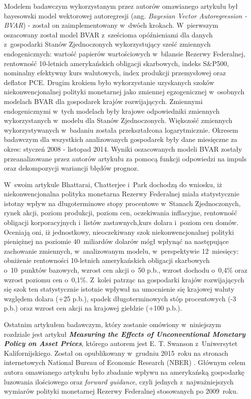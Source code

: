 Modelem badawczym wykorzystanym przez autorów omawianego artykułu był bayesowski model wektorowej autoregresji (ang. \textit{Bayesian Vector Autoregression - BVAR})  - został on zaimplementowany w~dwóch krokach. W~pierwszym oszacowany został model \acs{BVAR} z~sześcioma opóźnieniami dla danych z~gospodarki Stanów Zjednoczonych wykorzystujący sześć zmiennych endogenicznych: wartość papierów wartościowych w~bilansie Rezerwy Federalnej, rentowność 10-letnich amerykańskich obligacji skarbowych, indeks S\&P500, nominalny efektywny kurs walutowych, index produkcji przemysłowej oraz deflator \acs{PCE}. Drugim krokiem było wykorzystanie uzyskanych szoków niekonwencjonalnej polityki monetarnej jako zmiennej egzogenicznej w~osobnych modelach \acs{BVAR} dla gospodarek krajów rozwijających. Zmiennymi endogenicznymi w~tych modelach były krajowe odpowiedniki zmiennych wykorzystanych w~modelu dla Stanów Zjednoczonych. Większość zmiennych wykorzystywanych w~badaniu została przekształcona logarytmicznie. Okresem badawczym dla wszystkich analizowanych gospodarek były dane miesięczne za okres: styczeń 2008 - listopad 2014. Wyniki oszacowanych modeli \acs{BVAR} zostały przeanalizowane przez autorów artykułu za pomocą funkcji odpowiedzi na impuls oraz dekompozycji wariancji błędów prognoz.

W~swoim artykule Bhattarai, Chatterjee i~Park dochodzą do wniosku, iż niekonwencjonalna polityka monetarna Rezerwy Federalnej miała statystycznie istotny wpływ na długoterminowe stopy procentowe w~Stanach Zjednoczonych, rynek akcji, poziom produkcji, poziom cen, oczekiwania inflacyjne, rentowność obligacji korporacyjnych i~listów zastawnych,kurs dolara i~poziom cen domów. Oceniają oni, iż jednostkowy, nieoczekiwany szok niekonwencjonalnej polityki pieniężnej na poziomie 40~miliardów dolarów mógł wpłynąć na następujące zachowanie zmiennych, w~analizowanym modelu, w~perspektywie 12~miesięcy: obniżenie rentowności 10-letnich amerykańskich obligacji skarbowych o~10~punktów bazowych, wzrost cen akcji o~50 p.b., wzrost dochodu o~0,4\% oraz wzrost poziomu cen o~0,1\%. Z~kolei patrząc na gospodarki krajów rozwijających się szok ten statystycznie istotnie wpływał na umocnienie się krajowej waluty względem dolara (+25 p.b.), spadek długoterminowych stóp procentowych (-3 p.b.) oraz wzrost cen akcji na krajowej giełdzie (+100 p.b.). 

Ostatnim artykułem badawczym, który zostanie omówiony w~niniejszym rozdziale jest artykuł \textbf{\textit{Measuring the Effects of Unconventional Monetary Policy on Asset Prices}}, którego autorem jest E. T. Swanson z~Uniwersytet Kalifornijskiego. Został on opublikowany w~grudniu 2015~roku na stronach internetowych {National Bureau of Economic Research (NBER)} \cite{swanson37}. Głównym celem autora omawianego artykułu było zbadanie wpływu na amerykańską gospodarkę luzowania ilościowego oraz \textit{forward guidance}, czyli jednych z~najważniejszych wymiarów polityki monetarnej Rezerwy Federalnej stosowanych po 2009~roku.

